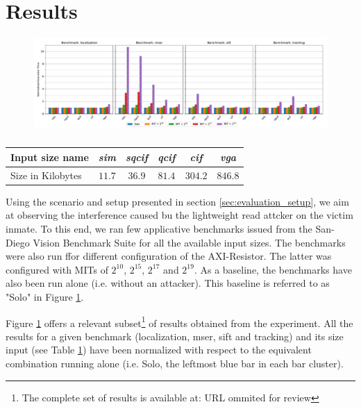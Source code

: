 \section{Results}
    \label{sec:results}
    \begin{figure}
        \centering
        \includegraphics[scale=0.425]{images/cpu-brainfreeze-interference.pdf}
        \caption{}
        \label{fig:cpu-brainfreeze-interference-results}
    \end{figure}

    \begin{table}
        \centering
        \caption{}
        \label{tab:sd-vbs-input-sizes}
        \begin{tabular}{|l||c|c|c|c|c|}
            \hline
            Input size name  & \emph{sim} & \emph{sqcif} & \emph{qcif} & \emph{cif} & \emph{vga} \\
            \hline
            Size in Kilobytes &  $11.7$ &    $36.9$ &   $81.4$ & $304.2$ & $846.8$ \\
            \hline
        \end{tabular}
    \end{table}

    Using the scenario and setup presented in section \ref{sec:evaluation_setup}, we aim at observing the interference caused bu the lightweight read attcker on the victim inmate. To this end, we ran few applicative benchmarks issued from the San-Diego Vision Benchmark Suite \cite{SD-VBS} for all the available input sizes. The benchmarks were also run ffor different configuration of the AXI-Resistor. The latter was configured with MITs of $2^{10}$, $2^{15}$, $2^{17}$ and $2^{19}$. As a baseline, the benchmarks have also been run alone (i.e. without an attacker). This baseline is referred to as "Solo" in Figure \ref{fig:cpu-brainfreeze-interference-results}.

    Figure \ref{fig:cpu-brainfreeze-interference-results} offers a relevant subset\footnote{The complete set of results is available at: URL ommited for review} of results obtained from the experiment. All the results for a given benchmark (localization, mser, sift and tracking) and its size input (see Table \ref{tab:sd-vbs-input-sizes}) have been normalized with respect to the equivalent combination running alone (i.e. Solo, the leftmost blue bar in each bar cluster).

